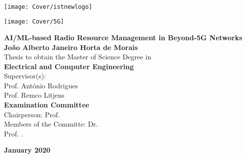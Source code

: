 \setcounter{page}{1} 


\thispagestyle{empty}
\begin{flushleft} ~\\ \vspace{-12mm} \hspace{-12mm}  \texttt{[image: Cover/istnewlogo]} 
\vspace{10mm}
\\ \begin{center} \texttt{[image: Cover/5G]}  \end{center} %
 \vspace{5mm}
\centering
\LARGE \textbf{AI/ML-based Radio Resource Management in Beyond-5G Networks}
\\ \vspace{15mm}
\Large \textbf{Jo{\~a}o Alberto Janeiro Horta de Morais} \\
\vspace{15mm}
\large Thesis to obtain the Master of Science Degree in
\\ \vspace{2mm}
\LARGE \textbf{Electrical and Computer Engineering}
\\ \vspace{10mm}
\large Supervisor(s): \\Prof. Ant{\'o}nio Rodrigues\\ Prof. Remco Litjens
\\ \vspace{10mm}
\Large \textbf{Examination Committee}
\\ \vspace{5mm}
\large Chairperson:	Prof.  \\
\large Members of the Committe: Dr. \\
Prof. .
 
\vspace{10mm}

\Large \textbf{January 2020} \\
\let\thepage\relax
\end{flushleft}
\pagebreak


\clearpage

\thispagestyle{empty}
\cleardoublepage

\setcounter{page}{1} 

\baselineskip 18pt %
